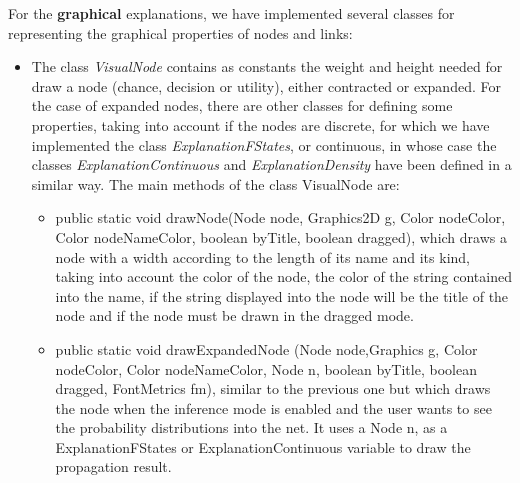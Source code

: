 For the \textbf{graphical} explanations, we have implemented
several classes for representing the graphical properties of nodes
and links:
\begin{itemize}
  \item The class \emph{VisualNode} contains as constants the weight and height needed for draw a node (chance, decision or utility),
  either contracted or expanded. For the case of expanded nodes, there are other classes
  for defining some properties, taking into account if the nodes are
  discrete, for which we have implemented the class \emph{ExplanationFStates}, or continuous,
  in whose case the classes \emph{ExplanationContinuous} and
  \emph{ExplanationDensity} have been defined in a similar way.
  The main methods of the class VisualNode are:
\begin{itemize}
  \item public static void drawNode(Node node, Graphics2D g, Color nodeColor,
        Color nodeNameColor, boolean byTitle, boolean dragged), which draws a node with a width according to
the length of its name and its kind, taking into account the color
of the node, the color of the string contained into the name, if
the string displayed into the node will be the title of the node
and if the node must be drawn in the dragged mode.
  \item public static void drawExpandedNode (Node node,Graphics g, Color nodeColor,
                  Color nodeNameColor, Node n,
                  boolean byTitle, boolean dragged,
                  FontMetrics fm), similar to the previous one but which draws the node when the inference mode is
                  enabled and the user wants to see the probability distributions into the net.
                  It uses a Node n, as a ExplanationFStates or ExplanationContinuous  variable
 to draw the propagation result.
\end{itemize}


\end{itemize}
